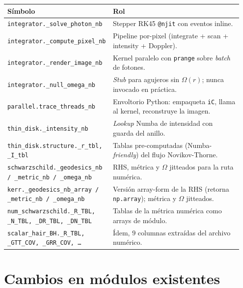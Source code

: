 \documentclass[11pt,a4paper]{article}
\begin{document}
\begin{center}
\small
\begin{tabular}{@{}p{0.40\linewidth}p{0.55\linewidth}@{}}
\toprule
\textbf{Símbolo} & \textbf{Rol} \\
\midrule
\texttt{integrator.\_solve\_photon\_nb} &
  Stepper RK45 \texttt{@njit} con eventos inline. \\
\texttt{integrator.\_compute\_pixel\_nb} &
  Pipeline por-pixel (integrate + scan + intensity + Doppler). \\
\texttt{integrator.\_render\_image\_nb} &
  Kernel paralelo con \texttt{prange} sobre \emph{batch} de fotones. \\
\texttt{integrator.\_null\_omega\_nb} &
  \emph{Stub} para agujeros sin $\Omega(r)$; nunca invocado en práctica. \\
\texttt{parallel.trace\_threads\_nb} &
  Envoltorio Python: empaqueta \texttt{iC}, llama al kernel,
  reconstruye la imagen. \\
\texttt{thin\_disk.\_intensity\_nb} &
  \emph{Lookup} Numba de intensidad con guarda del anillo. \\
\texttt{thin\_disk.structure.\_r\_tbl, \_I\_tbl} &
  Tablas pre-computadas (Numba-\emph{friendly}) del flujo Novikov-Thorne. \\
\texttt{schwarzschild.\_geodesics\_nb / \_metric\_nb / \_omega\_nb} &
  RHS, métrica y $\Omega$ jitteados para la ruta numérica. \\
\texttt{kerr.\_geodesics\_nb\_array / \_metric\_nb / \_omega\_nb} &
  Versión array-form de la RHS (retorna \texttt{np.array}); métrica y
  $\Omega$ jitteados. \\
\texttt{num\_schwarzschild.\_R\_TBL, \_N\_TBL, \_DR\_TBL, \_DN\_TBL} &
  Tablas de la métrica numérica como arrays de módulo. \\
\texttt{scalar\_hair\_BH.\_R\_TBL, \_GTT\_COV, \_GRR\_COV, \dots} &
  Ídem, $9$ columnas extraídas del archivo numérico. \\
\bottomrule
\end{tabular}
\end{center}

\section{Cambios en módulos existentes}
\end{document}
